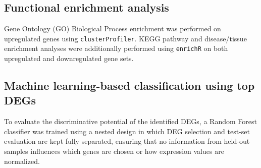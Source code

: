 \documentclass[12pt]{article}
\begin{document}
\subsection{Functional enrichment analysis}
Gene Ontology (GO) Biological Process enrichment was performed on upregulated
genes using \texttt{clusterProfiler}. KEGG pathway and disease/tissue
enrichment analyses were additionally performed using \texttt{enrichR} on both
upregulated and downregulated gene sets.

\subsection{Machine learning-based classification using top DEGs}
\label{sec:ml}
To evaluate the discriminative potential of the identified DEGs, a Random
Forest classifier was trained using a nested design in which DEG selection
and test-set evaluation are kept fully separated, ensuring that no
information from held-out samples influences which genes are chosen or how
expression values are normalized.
\end{document}
